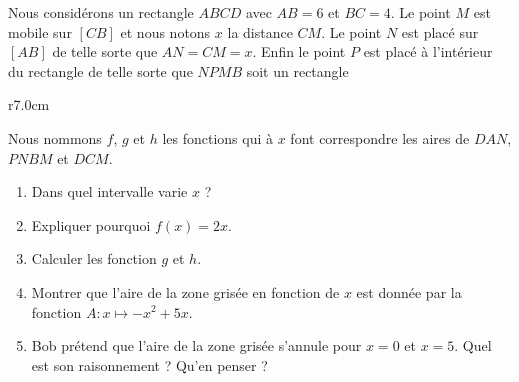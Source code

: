 
\begin{exercice}[\ldots/6]\label{exosmath-0633}

    Nous considérons un rectangle \( ABCD\) avec \( AB=6\) et \( BC=4\). Le point \( M\) est mobile sur \( [CB]\) et nous notons \( x\) la distance \( CM\). Le point \( N\) est placé sur \( [AB]\) de telle sorte que \( AN=CM=x\). Enfin le point \( P\) est placé à l'intérieur du rectangle de telle sorte que \( NPMB\) soit un rectangle

\begin{wrapfigure}{r}{7.0cm}
   \vspace{-0.5cm}        %
   \centering
   
\end{wrapfigure}

    Nous nommons \( f\), \( g\) et \( h\) les fonctions qui à \( x\) font correspondre les aires de \( DAN\), \( PNBM\) et \( DCM\).

    \begin{enumerate}
        \item
            Dans quel intervalle varie \( x\) ?
        \item
            Expliquer pourquoi \( f(x)=2x\).
        \item   %
            Calculer les fonction \( g\) et \( h\).
        \item   %
            Montrer que l'aire de la zone grisée en fonction de \( x\) est donnée par la fonction \( A\colon x\mapsto -x^2+5x\).
        \item   %
            Bob prétend que l'aire de la zone grisée s'annule pour \( x=0\) et \( x=5\). Quel est son raisonnement ? Qu'en penser ?
    \end{enumerate}

\end{exercice}
